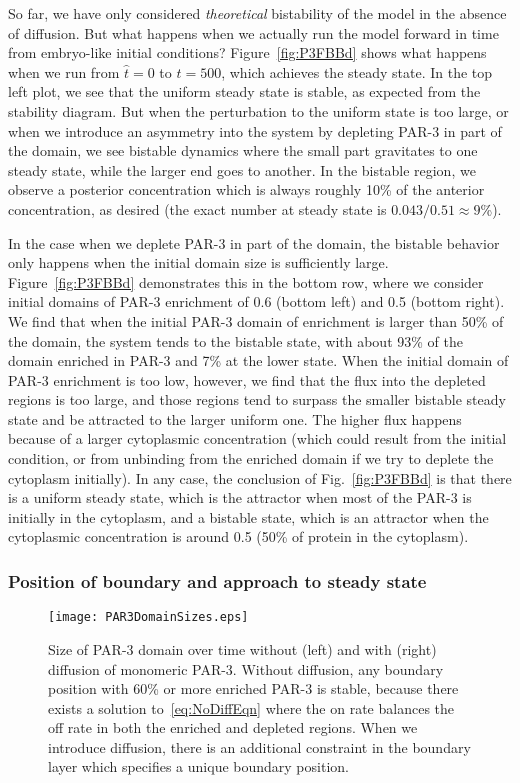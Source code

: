 \documentclass[11pt]{article}
\newcommand{\6}[1]{#1_{\text{6}}}
\newcommand{\3}[1]{#1_{\text{3}}}
\begin{document}
So far, we have only considered \emph{theoretical} bistability of the model in the absence of diffusion. But what happens when we actually run the model forward in time from embryo-like initial conditions?  Figure\ \ref{fig:P3FBBd} shows what happens when we run from $\hat t = 0$ to $\hat t = 500$, which achieves the steady state. In the top left plot, we see that the uniform steady state is stable, as expected from the stability diagram. But when the perturbation to the uniform state is too large, or when we introduce an asymmetry into the system by depleting PAR-3 in part of the domain, we see bistable dynamics where the small part gravitates to one steady state, while the larger end goes to another. In the bistable region, we observe a posterior concentration which is always roughly 10\% of the anterior concentration, as desired (the exact number at steady state is $0.043/0.51 \approx 9$\%).

In the case when we deplete PAR-3 in part of the domain, the bistable behavior only happens when the initial domain size is sufficiently large. Figure\ \ref{fig:P3FBBd} demonstrates this in the bottom row, where we consider initial domains of PAR-3 enrichment of 0.6 (bottom left) and 0.5 (bottom right). We find that when the initial PAR-3 domain of enrichment is larger than 50\% of the domain, the system tends to the bistable state, with about 93\% of the domain enriched in PAR-3 and 7\% at the lower state. When the initial domain of PAR-3 enrichment is too low, however, we find that the flux into the depleted regions is too large, and those regions tend to surpass the smaller bistable steady state and be attracted to the larger uniform one. The higher flux happens because of a larger cytoplasmic concentration (which could result from the initial condition, or from unbinding from the enriched domain if we try to deplete the cytoplasm initially). In any case, the conclusion of Fig.\ \ref{fig:P3FBBd} is that there is a uniform steady state, which is the attractor when most of the PAR-3 is initially in the cytoplasm, and a bistable state, which is an attractor when the cytoplasmic concentration is around 0.5 (50\% of protein in the cytoplasm). 

\subsubsection{Position of boundary and approach to steady state}

\begin{figure}
\centering
\texttt{[image: PAR3DomainSizes.eps]}
\caption{\label{fig:WWoDiff}Size of PAR-3 domain over time without (left) and with (right) diffusion of monomeric PAR-3. Without diffusion, any boundary position with 60\% or more enriched PAR-3 is stable, because there exists a solution to\ \eqref{eq:NoDiffEqn} where the on rate balances the off rate in both the enriched and depleted regions. When we introduce diffusion, there is an additional constraint in the boundary layer which specifies a unique boundary position.}
\end{figure}
\end{document}
